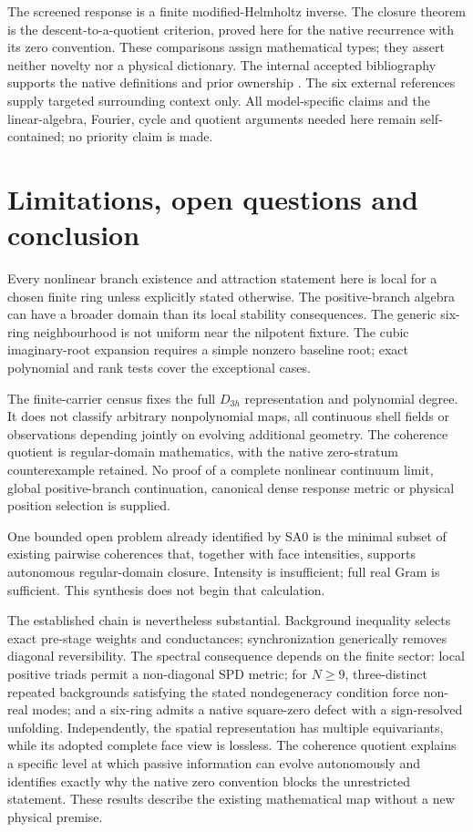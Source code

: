 The screened response is a finite modified-Helmholtz inverse. The closure theorem is the descent-to-a-quotient criterion, proved here for the native recurrence with its zero convention. These comparisons assign mathematical types; they assert neither novelty nor a physical dictionary. The internal accepted bibliography supports the native definitions and prior ownership \cite{PA,PB,PC,PD,PE,PF,AT04,AT08}. The six external references supply targeted surrounding context only. All model-specific claims and the linear-algebra, Fourier, cycle and quotient arguments needed here remain self-contained; no priority claim is made.

\section{Limitations, open questions and conclusion}
Every nonlinear branch existence and attraction statement here is local for a chosen finite ring unless explicitly stated otherwise. The positive-branch algebra can have a broader domain than its local stability consequences. The generic six-ring neighbourhood is not uniform near the nilpotent fixture. The cubic imaginary-root expansion requires a simple nonzero baseline root; exact polynomial and rank tests cover the exceptional cases.

The finite-carrier census fixes the full \(D_{3h}\) representation and polynomial degree. It does not classify arbitrary nonpolynomial maps, all continuous shell fields or observations depending jointly on evolving additional geometry. The coherence quotient is regular-domain mathematics, with the native zero-stratum counterexample retained. No proof of a complete nonlinear continuum limit, global positive-branch continuation, canonical dense response metric or physical position selection is supplied.

One bounded open problem already identified by SA0 is the minimal subset of existing pairwise coherences that, together with face intensities, supports autonomous regular-domain closure. Intensity is insufficient; full real Gram is sufficient. This synthesis does not begin that calculation.

The established chain is nevertheless substantial. Background inequality selects exact pre-stage weights and conductances; synchronization generically removes diagonal reversibility. The spectral consequence depends on the finite sector: local positive triads permit a non-diagonal SPD metric; for \(N\ge9\), three-distinct repeated backgrounds satisfying the stated nondegeneracy condition force non-real modes; and a six-ring admits a native square-zero defect with a sign-resolved unfolding. Independently, the spatial representation has multiple equivariants, while its adopted complete face view is lossless. The coherence quotient explains a specific level at which passive information can evolve autonomously and identifies exactly why the native zero convention blocks the unrestricted statement. These results describe the existing mathematical map without a new physical premise.

